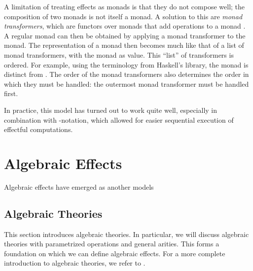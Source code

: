 
A limitation of treating effects as monads is that they do not compose well; the composition of two monads is not itself a monad. A solution to this are \emph{monad transformers}, which are functors over monads that add operations to a monad \autocite{moggi_abstract_1989}. A regular monad can then be obtained by applying a monad transformer to the  monad. The representation of a monad then becomes much like that of a list of monad transformers, with the  monad as  value. This ``list'' of transformers is ordered. For example, using the terminology from Haskell's  library, the monad  is distinct from . The order of the monad transformers also determines the order in which they must be handled: the outermost monad transformer must be handled first.

In practice, this model has turned out to work quite well, especially in combination with -notation, which allowed for easier sequential execution of effectful computations.

\section{Algebraic Effects}\label{sec:alg}



Algebraic effects have emerged as another models 

\subsection{Algebraic Theories}

This section introduces algebraic theories. In particular, we will discuss algebraic theories with parametrized operations and general arities. This forms a foundation on which we can define algebraic effects. For a more complete introduction to algebraic theories, we refer to \textcite{bauer_what_2018}.

